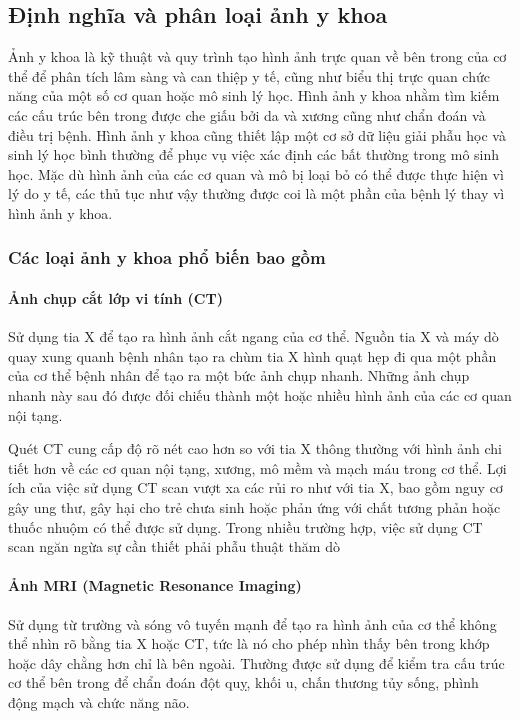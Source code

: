 \subsection{Định nghĩa và phân loại ảnh y khoa}
Ảnh y khoa là kỹ thuật và quy trình tạo hình ảnh trực quan về bên trong của cơ thể để phân tích lâm sàng và can thiệp y tế, cũng như biểu thị trực quan chức năng của một số cơ quan hoặc mô sinh lý học. Hình ảnh y khoa nhằm tìm kiếm các cấu trúc bên trong được che giấu bởi da và xương cũng như chẩn đoán và điều trị bệnh. Hình ảnh y khoa cũng thiết lập một cơ sở dữ liệu giải phẫu học và sinh lý học bình thường để phục vụ việc xác định các bất thường trong mô sinh học. Mặc dù hình ảnh của các cơ quan và mô bị loại bỏ có thể được thực hiện vì lý do y tế, các thủ tục như vậy thường được coi là một phần của bệnh lý thay vì hình ảnh y khoa.

\subsubsection{Các loại ảnh y khoa phổ biến bao gồm}
\paragraph{Ảnh chụp cắt lớp vi tính (CT)}Sử dụng tia X để tạo ra hình ảnh cắt ngang của cơ thể. Nguồn tia X và máy dò quay xung quanh bệnh nhân tạo ra chùm tia X hình quạt hẹp đi qua một phần của cơ thể bệnh nhân để tạo ra một bức ảnh chụp nhanh. Những ảnh chụp nhanh này sau đó được đối chiếu thành một hoặc nhiều hình ảnh của các cơ quan nội tạng.\par

Quét CT cung cấp độ rõ nét cao hơn so với tia X thông thường với hình ảnh chi tiết hơn về các cơ quan nội tạng, xương, mô mềm và mạch máu trong cơ thể. Lợi ích của việc sử dụng CT scan vượt xa các rủi ro như với tia X, bao gồm nguy cơ gây ung thư, gây hại cho trẻ chưa sinh hoặc phản ứng với chất tương phản hoặc thuốc nhuộm có thể được sử dụng. Trong nhiều trường hợp, việc sử dụng CT scan ngăn ngừa sự cần thiết phải phẫu thuật thăm dò
\vspace{-0.7cm}
\paragraph{Ảnh MRI (Magnetic Resonance Imaging)}Sử dụng từ trường và sóng vô tuyến mạnh để tạo ra hình ảnh của cơ thể không thể nhìn rõ bằng tia X hoặc CT, tức là nó cho phép nhìn thấy bên trong khớp hoặc dây chằng hơn chỉ là bên ngoài. Thường được sử dụng để kiểm tra cấu trúc cơ thể bên trong để chẩn đoán đột quỵ, khối u, chấn thương tủy sống, phình động mạch và chức năng não.
\vspace{-0.7cm}                
